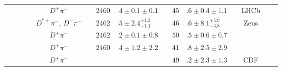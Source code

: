 \begin{adjustbox}{width=0.76\textwidth,center}
{\begin{tabular}{cp{5pt}cp{5pt}cp{5pt}r@{}lp{5pt}r@{}lp{5pt}cp{5pt}c}
		                                         &                  &                              &                  & $D^{+}\pi^{-}$                  &                       & $	2460$                       & $.4\pm0.1\pm0.1	$                             &                       & $	45$                                            & $.6\pm0.4\pm1.1	$                            &                       & LHCb                                                          &                       & \cite{Aaij:2013sza}                       \\
		                                         &                  &                              &                  & $D^{*+}\pi^{-}$, $D^{+}\pi^{-}$ &                       & $	2462$                       & $.5\pm2.4^{+1.3}_{-1.1}	$                     &                       & $	46$                                            & $.6\pm8.1^{+5.9}_{-3.8}	$                    &                       & Zeus                                                          &                       & \cite{Abramowicz:2012ys}                  \\
		                                         &                  &                              &                  & $D^{+}\pi^{-}$                  &                       & $	2462$                       & $.2\pm0.1\pm0.8	$                             &                       & $	50$                                            & $.5\pm0.6\pm0.7	$                            &                       & \babar{}                                                      &                       & \cite{delAmoSanchez:2010vq}               \\
		                                         &                  &                              &                  & $D^{+}\pi^{-}$                  &                       & $	2460$                       & $.4\pm1.2\pm2.2	$                             &                       & $	41$                                            & $.8\pm2.5\pm2.9	$                            &                       & \babar{}                                                      &                       & \cite{Aubert:2009wg}                      \\
		                                         &                  &                              &                  & $D^{+}\pi^{-}$                  &                       & $		$                          &                                               &                       & $	49$                                            & $.2\pm2.3\pm1.3	$                            &                       & CDF                                                           &                       & \cite{Abulencia:2005ry}                   \\

\end{tabular}}
\end{adjustbox}
